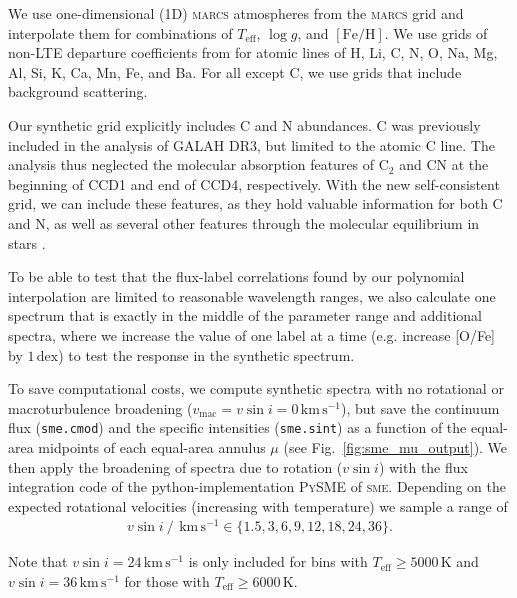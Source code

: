 \documentclass[
  journal=pasa,
  manuscript=research-paper, %
  year=2024,
  volume=37
]{cup-journal}
\newcommand{\Teff}{$T_\mathrm{eff}$\xspace}
\newcommand{\logg}{$\log g$\xspace}
\newcommand{\feh}{$\mathrm{[Fe/H]}$\xspace}
\newcommand{\vsini}{$v \sin i$\xspace}
\newcommand{\sme}{\textsc{sme}\xspace}
\newcommand{\marcs}{\textsc{marcs}\xspace}
\newcommand{\dex}{\,\mathrm{dex}}	%
\newcommand{\kms}{\,\mathrm{km\,s^{-1}}}	%
\begin{document}
We use one-dimensional (1D) \marcs atmospheres from the \marcs grid \citep[][version 2014]{Gustafsson2008} and interpolate them for combinations of \Teff, \logg, and \feh. We use grids of non-LTE departure coefficients from \citet{Amarsi2020, Amarsi2022} for atomic lines of H, Li, C, N, O, Na, Mg, Al, Si, K, Ca, Mn, Fe, and Ba. For all except C, we use grids that include background scattering.

Our synthetic grid explicitly includes C and N abundances. C was previously included in the analysis of GALAH DR3, but limited to the atomic C line. The analysis thus neglected the molecular absorption features of $\mathrm{C_2}$ and CN at the beginning of CCD1 and end of CCD4, respectively. With the new self-consistent grid, we can include these features, as they hold valuable information for both C and N, as well as several other features through the molecular equilibrium in stars \citep[see e.g.][]{Ting2018}.

To be able to test that the flux-label correlations found by our polynomial interpolation are limited to reasonable wavelength ranges, we also calculate one spectrum that is exactly in the middle of the parameter range and additional spectra, where we increase the value of one label at a time (e.g. increase [O/Fe] by $1\dex$) to test the response in the synthetic spectrum.

To save computational costs, we compute synthetic spectra with no rotational or macroturbulence broadening ($v_\text{mac} = v\sin i = 0\kms$), but save the continuum flux (\texttt{sme.cmod}) and the specific intensities (\texttt{sme.sint}) as a function of the equal-area midpoints of each equal-area annulus $\mu$ (see Fig.~\ref{fig:sme_mu_output}). We then apply the broadening of spectra due to rotation (\vsini) with the flux integration code of the python-implementation \textsc{PySME} \citep{Wehrhahn2023} of \sme. Depending on the expected rotational velocities (increasing with temperature) we sample a range of
\begin{align} \label{eq:vsini}
    v \sin i~/~\kms \in \{ 1.5, 3, 6, 9, 12, 18, 24, 36\}.
\end{align}

Note that $v \sin i = 24 \kms$ is only included for bins with \Teff$\geq 5000\,\mathrm{K}$ and $v \sin i = 36 \kms$ for those with \Teff$\geq 6000\,\mathrm{K}$.

\end{document}
